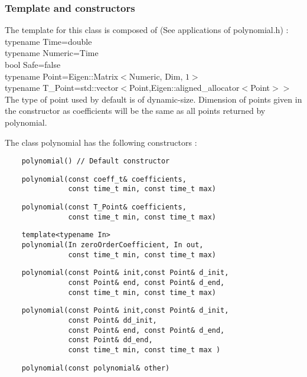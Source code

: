 \documentclass{article}
\begin{document}
    \subsubsection{Template and constructors}

    The template for this class is composed of (See applications of polynomial.h) :\\
    typename Time=double\\
    typename Numeric=Time\\
    bool Safe=false\\
    typename Point=Eigen::Matrix$<$Numeric, Dim, $1>$\\
    typename T\_Point=std::vector$<$Point,Eigen::aligned\_allocator$<$Point$> >$\\
    The type of point used by default is of dynamic-size. Dimension of points given in the constructor as coefficients will be the same as all points returned by polynomial.

    The class polynomial has the following constructors :
    \begin{lstlisting}
    polynomial() // Default constructor
    \end{lstlisting}
    \begin{lstlisting}
    polynomial(const coeff_t& coefficients,
               const time_t min, const time_t max)
    \end{lstlisting}
    \begin{lstlisting}
    polynomial(const T_Point& coefficients,
               const time_t min, const time_t max)
    \end{lstlisting}
    \begin{lstlisting}
    template<typename In>
    polynomial(In zeroOrderCoefficient, In out,
               const time_t min, const time_t max)
    \end{lstlisting}
    \begin{lstlisting}
    polynomial(const Point& init,const Point& d_init,
               const Point& end, const Point& d_end,
               const time_t min, const time_t max)
    \end{lstlisting}
    \begin{lstlisting}
    polynomial(const Point& init,const Point& d_init,
               const Point& dd_init,
               const Point& end, const Point& d_end,
               const Point& dd_end,
               const time_t min, const time_t max )
    \end{lstlisting}
    \begin{lstlisting}
    polynomial(const polynomial& other)
    \end{lstlisting}
\end{document}
